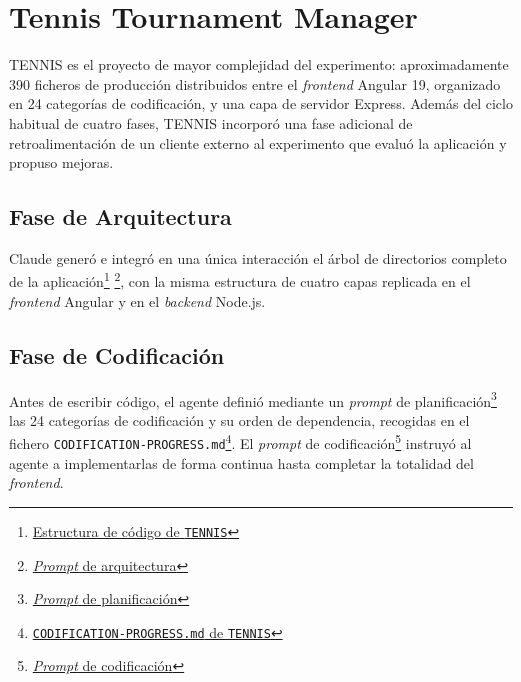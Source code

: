\section{Tennis Tournament Manager} \label{sec:dev-tennis}

\ac{TENNIS} es el proyecto de mayor complejidad del experimento: aproximadamente 390 ficheros de producción distribuidos entre el \textit{frontend} Angular 19, organizado en 24 categorías de codificación, y una capa de servidor Express. Además del ciclo habitual de cuatro fases, \ac{TENNIS} incorporó una fase adicional de retroalimentación de un cliente externo al experimento que evaluó la aplicación y propuso mejoras.

\subsection{Fase de Arquitectura}

Claude generó e integró en una única interacción el árbol de directorios completo de la aplicación\footnote{\href{https://github.com/alu0101549491/TFG-Fabian-Gonzalez-Lence/blob/main/resources/project-structures/5-TennisTournamentManager.md}{Estructura de código de \texttt{TENNIS}}} \footnote{\href{https://github.com/alu0101549491/TFG-Fabian-Gonzalez-Lence/blob/main/resources/prompts/5-TennisTournamentManager/1-Inicializacion/architecture.prompt.md}{\textit{Prompt} de arquitectura}}, con la misma estructura de cuatro capas replicada en el \textit{frontend} Angular y en el \textit{backend} Node.js.

\subsection{Fase de Codificación}

Antes de escribir código, el agente definió mediante un \textit{prompt} de planificación\footnote{\href{https://github.com/alu0101549491/TFG-Fabian-Gonzalez-Lence/blob/main/resources/prompts/5-TennisTournamentManager/3-Codificacion/planning.prompt.md}{\textit{Prompt} de planificación}} las 24 categorías de codificación y su orden de dependencia, recogidas en el fichero \texttt{CODIFICATION-PROGRESS.md}\footnote{\href{https://github.com/alu0101549491/TFG-Fabian-Gonzalez-Lence/blob/main/projects/5-TennisTournamentManager/docs/code/CODIFICATION-PROGRESS.md}{\texttt{CODIFICATION-PROGRESS.md} de \texttt{TENNIS}}}. El \textit{prompt} de codificación\footnote{\href{https://github.com/alu0101549491/TFG-Fabian-Gonzalez-Lence/blob/main/resources/prompts/5-TennisTournamentManager/3-Codificacion/codification.prompt.md}{\textit{Prompt} de codificación}} instruyó al agente a implementarlas de forma continua hasta completar la totalidad del \textit{frontend}.

